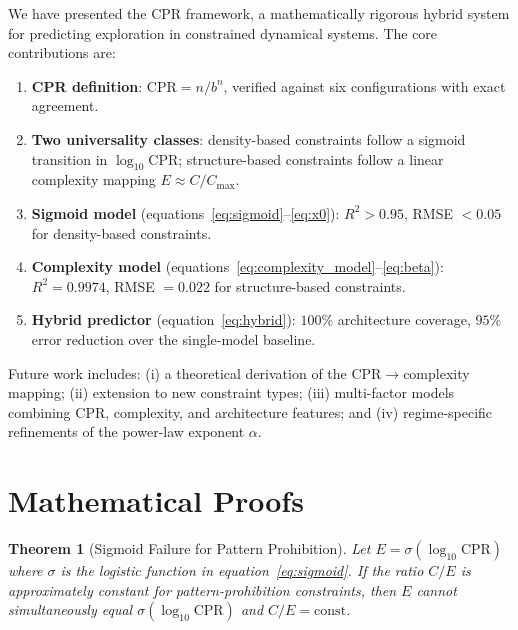 \documentclass[12pt,a4paper]{article}
\newtheorem{theorem}{Theorem}
\begin{document}
We have presented the CPR framework, a mathematically rigorous hybrid system for predicting exploration in constrained dynamical systems. The core contributions are:

\begin{enumerate}
    \item \textbf{CPR definition}: $\mathrm{CPR} = n/b^{n}$, verified against six configurations with exact agreement.
    \item \textbf{Two universality classes}: density-based constraints follow a sigmoid transition in $\log_{10}\mathrm{CPR}$; structure-based constraints follow a linear complexity mapping $E \approx C/C_{\max}$.
    \item \textbf{Sigmoid model} (equations~\eqref{eq:sigmoid}--\eqref{eq:x0}): $R^{2} > 0.95$, RMSE $< 0.05$ for density-based constraints.
    \item \textbf{Complexity model} (equations~\eqref{eq:complexity_model}--\eqref{eq:beta}): $R^{2} = 0.9974$, RMSE $= 0.022$ for structure-based constraints.
    \item \textbf{Hybrid predictor} (equation~\eqref{eq:hybrid}): $100\%$ architecture coverage, $95\%$ error reduction over the single-model baseline.
\end{enumerate}

Future work includes: (i) a theoretical derivation of the CPR$\to$complexity mapping; (ii) extension to new constraint types; (iii) multi-factor models combining CPR, complexity, and architecture features; and (iv) regime-specific refinements of the power-law exponent $\alpha$.

\appendix

\section{Mathematical Proofs}\label{app:proofs}

\begin{theorem}[Sigmoid Failure for Pattern Prohibition]\label{thm:sigmoid_fail}
Let $E = \sigma(\log_{10}\mathrm{CPR})$ where $\sigma$ is the logistic function in equation~\eqref{eq:sigmoid}. If the ratio $C/E$ is approximately constant for pattern-prohibition constraints, then $E$ cannot simultaneously equal $\sigma(\log_{10}\mathrm{CPR})$ and $C/E = \text{const}$.
\end{theorem}
\end{document}
